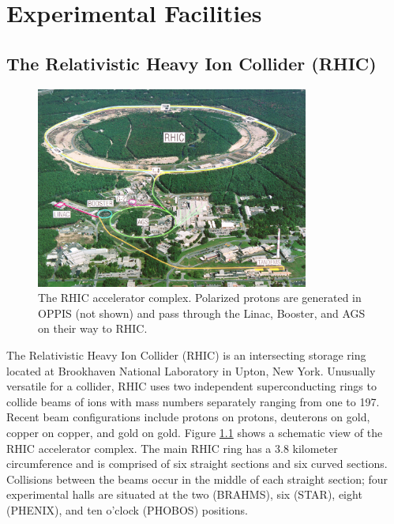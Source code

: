 \chapter{Experimental Facilities}

\section{The Relativistic Heavy Ion Collider (RHIC)}

\begin{figure}
  \begin{center}
    \includegraphics[width=0.8\textwidth]{figures/rhic-from-above}
  \end{center}
  \caption{The RHIC accelerator complex. Polarized protons are generated in
  OPPIS (not shown) and pass through the Linac, Booster, and AGS on their way
  to RHIC.}
  \label{fig:rhic}
\end{figure}

The Relativistic Heavy Ion Collider (RHIC) is an intersecting storage ring
located at Brookhaven National Laboratory in Upton, New York. Unusually
versatile for a collider, RHIC uses two independent superconducting rings to
collide beams of ions with mass numbers separately ranging from one to 197.
Recent beam configurations include protons on protons, deuterons on gold,
copper on copper, and gold on gold. Figure \ref{fig:rhic} shows a schematic
view of the RHIC accelerator complex. The main RHIC ring has a 3.8 kilometer
circumference and is comprised of six straight sections and six curved
sections. Collisions between the beams occur in the middle of each straight
section; four experimental halls are situated at the two (BRAHMS), six (STAR),
eight (PHENIX), and ten o'clock (PHOBOS) positions.

